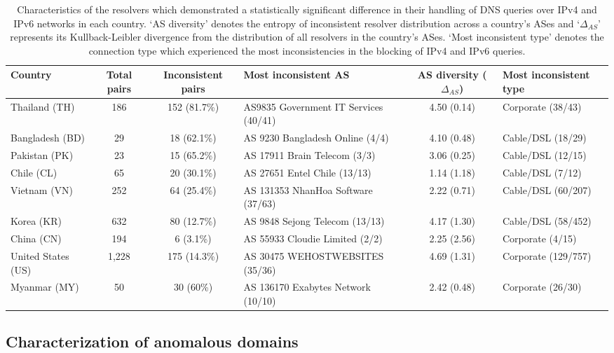 \begin{table*}[t]
  \centering
  \small
  \scalebox{\tabularscale} {
    \begin{tabular}{lccp{2in}cp{1.5in}}
    \toprule
      {\bf Country} & 
      {\bf Total pairs} & {\bf Inconsistent pairs} & 
      {\bf Most inconsistent AS} & 
      {\bf AS diversity ($\Delta_{AS}$)} &
      {\bf Most inconsistent type} 
    \\ \midrule
      Thailand (TH)       & 186 & 152 (81.7\%)  &  AS9835 Government IT Services (40/41)  & 4.50 (0.14) & Corporate (38/43) \\
      Bangladesh (BD)     & 29  & 18 (62.1\%) & AS 9230 Bangladesh Online (4/4)           & 4.10 (0.48) & Cable/DSL (18/29) \\    
      Pakistan (PK)       & 23  & 15 (65.2\%) & AS 17911 Brain Telecom (3/3)              & 3.06 (0.25) & Cable/DSL (12/15) \\    
      Chile (CL)          & 65  & 20 (30.1\%) & AS 27651 Entel Chile (13/13)              & 1.14 (1.18) & Cable/DSL (7/12) \\    
      Vietnam (VN)        & 252 & 64 (25.4\%) & AS 131353 NhanHoa Software (37/63)        & 2.22 (0.71) & Cable/DSL (60/207) \\    
      Korea (KR)          & 632 & 80 (12.7\%) & AS 9848 Sejong Telecom (13/13) & 4.17 (1.30) & Cable/DSL (58/452) \\    
      China (CN)          & 194 & 6 (3.1\%)   & AS 55933 Cloudie Limited (2/2) & 2.25 (2.56) & Corporate (4/15)   \\    
    \midrule
      United States (US)  & 1,228 & 175 (14.3\%)  & AS 30475 WEHOSTWEBSITES (35/36) & 4.69 (1.31) & Corporate (129/757) \\    
      Myanmar (MY)        & 50  & 30 (60\%)   & AS 136170 Exabytes Network (10/10) & 2.42 (0.48) & Corporate (26/30) \\    
    \bottomrule
  \end{tabular}
  }
  \caption{Characteristics of the resolvers which demonstrated a statistically
  significant difference in their handling of DNS queries over IPv4 and IPv6
  networks in each country. `AS diversity' denotes the entropy of inconsistent
  resolver distribution across a country's ASes and `$\Delta_{AS}$' represents its
  Kullback-Leibler divergence from the distribution of all resolvers in the
  country's ASes. `Most inconsistent type' denotes the connection type which
  experienced the most inconsistencies in the blocking of IPv4 and IPv6
  queries.}
  \label{tab:resources:resolvers}
\end{table*}


\subsection{Characterization of anomalous domains}
\label{sec:infrastructure:domains}

